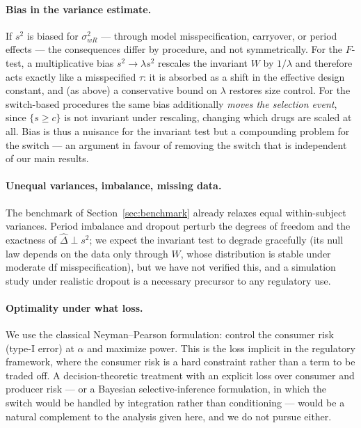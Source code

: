 \documentclass[11pt]{article}
\theoremstyle{remark}
\newcommand{\Dhat}{\hat{\Delta}}
\begin{document}
\paragraph{Bias in the variance estimate.} If $s^2$ is biased for $\sigma^2_{wR}$ --- through model misspecification, carryover, or period effects --- the consequences differ by procedure, and not symmetrically. For the $F$-test, a multiplicative bias $s^2\to\lambda s^2$ rescales the invariant $W$ by $1/\lambda$ and therefore acts exactly like a misspecified $\tau$: it is absorbed as a shift in the effective design constant, and (as above) a conservative bound on $\lambda$ restores size control. For the switch-based procedures the same bias additionally \emph{moves the selection event}, since $\{s\ge c\}$ is not invariant under rescaling, changing which drugs are scaled at all. Bias is thus a nuisance for the invariant test but a compounding problem for the switch --- an argument in favour of removing the switch that is independent of our main results.

\paragraph{Unequal variances, imbalance, missing data.} The benchmark of Section~\ref{sec:benchmark} already relaxes equal within-subject variances. Period imbalance and dropout perturb the degrees of freedom and the exactness of $\Dhat\perp s^2$; we expect the invariant test to degrade gracefully (its null law depends on the data only through $W$, whose distribution is stable under moderate df misspecification), but we have not verified this, and a simulation study under realistic dropout is a necessary precursor to any regulatory use.

\paragraph{Optimality under what loss.} We use the classical Neyman--Pearson formulation: control the consumer risk (type-I error) at $\alpha$ and maximize power. This is the loss implicit in the regulatory framework, where the consumer risk is a hard constraint rather than a term to be traded off. A decision-theoretic treatment with an explicit loss over consumer and producer risk --- or a Bayesian selective-inference formulation, in which the switch would be handled by integration rather than conditioning --- would be a natural complement to the analysis given here, and we do not pursue either.
\end{document}
